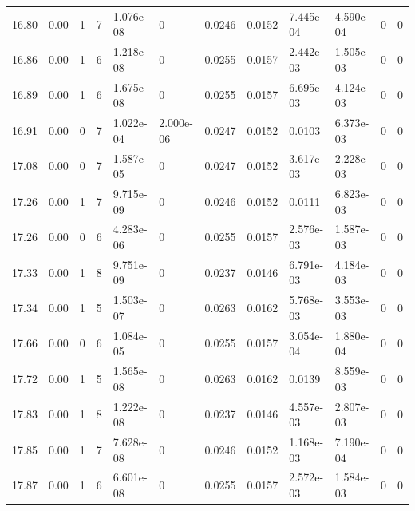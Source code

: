 \documentclass[preview]{standalone}
\begin{document}
{{{{{{\begin{tabular}{L{1.2cm}C{1.2cm} C{0.3cm}C{0.5cm} C{1.4cm}C{1.4cm} C{1.4cm}C{1.4cm} C{1.6cm}C{1.6cm} C{1.6cm}C{1.6cm}}
  16.80  &  0.00  & 1     &  7 &  1.076e-08  & 0  &  0.0246&   0.0152& 7.445e-04 & 4.590e-04   &  0 & 0  \\ 
  16.86  &  0.00  & 1     &  6 &  1.218e-08  & 0  &  0.0255&   0.0157& 2.442e-03 & 1.505e-03   &  0 & 0  \\ 
  16.89  &  0.00  & 1     &  6 &  1.675e-08  & 0  &  0.0255&   0.0157& 6.695e-03 & 4.124e-03   &  0 & 0  \\ 
  16.91  &  0.00  & 0     &  7 &  1.022e-04  & 2.000e-06  &  0.0247&   0.0152& 0.0103 & 6.373e-03   &  0 & 0  \\ 
  17.08  &  0.00  & 0     &  7 &  1.587e-05  & 0  &  0.0247&   0.0152& 3.617e-03 & 2.228e-03   &  0 & 0  \\ 
  17.26  &  0.00  & 1     &  7 &  9.715e-09  & 0  &  0.0246&   0.0152& 0.0111 & 6.823e-03   &  0 & 0  \\ 
  17.26  &  0.00  & 0     &  6 &  4.283e-06  & 0  &  0.0255&   0.0157& 2.576e-03 & 1.587e-03   &  0 & 0  \\ 
  17.33  &  0.00  & 1     &  8 &  9.751e-09  & 0  &  0.0237&   0.0146& 6.791e-03 & 4.184e-03   &  0 & 0  \\ 
  17.34  &  0.00  & 1     &  5 &  1.503e-07  & 0  &  0.0263&   0.0162& 5.768e-03 & 3.553e-03   &  0 & 0  \\ 
  17.66  &  0.00  & 0     &  6 &  1.084e-05  & 0  &  0.0255&   0.0157& 3.054e-04 & 1.880e-04   &  0 & 0  \\ 
  17.72  &  0.00  & 1     &  5 &  1.565e-08  & 0  &  0.0263&   0.0162& 0.0139 & 8.559e-03   &  0 & 0  \\ 
  17.83  &  0.00  & 1     &  8 &  1.222e-08  & 0  &  0.0237&   0.0146& 4.557e-03 & 2.807e-03   &  0 & 0  \\ 
  17.85  &  0.00  & 1     &  7 &  7.628e-08  & 0  &  0.0246&   0.0152& 1.168e-03 & 7.190e-04   &  0 & 0  \\ 
  17.87  &  0.00  & 1     &  6 &  6.601e-08  & 0  &  0.0255&   0.0157& 2.572e-03 & 1.584e-03   &  0 & 0  \\ 
\hline 
\end{tabular} 

}}}}}}
\end{document}
